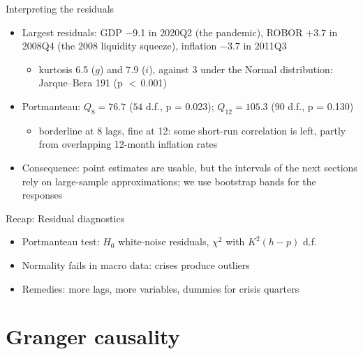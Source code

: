 \begin{frame}{Interpreting the residuals}
\itemsize{\small}
\begin{itemize}
    \item Largest residuals: GDP $-$9.1 in 2020Q2 (the pandemic), ROBOR $+3.7$ in 2008Q4 (the 2008 liquidity squeeze), inflation $-$3.7 in 2011Q3
    \begin{itemize}
        \item kurtosis 6.5 ($g$) and 7.9 ($i$), against 3 under the Normal distribution: Jarque--Bera 191 (p $<$\,0.001)
    \end{itemize}
    \item Portmanteau: $Q_8 = 76.7$ ($54$ d.f., p = 0.023); $Q_{12} = 105.3$ ($90$ d.f., p = 0.130)
    \begin{itemize}
        \item borderline at 8 lags, fine at 12: some short-run correlation is left, partly from overlapping 12-month inflation rates
    \end{itemize}
    \item Consequence: point estimates are usable, but the intervals of the next sections rely on large-sample approximations; we use bootstrap bands for the responses
\end{itemize}
\end{frame}

\begin{frame}{Recap: Residual diagnostics}
\itemsize{\small}
\begin{itemize}
    \item Portmanteau test: $H_0$ white-noise residuals, $\chi^2$ with $K^2(h - p)$ d.f.
    \item Normality fails in macro data: crises produce outliers
    \item Remedies: more lags, more variables, dummies for crisis quarters
\end{itemize}
\end{frame}


\section{Granger causality}

